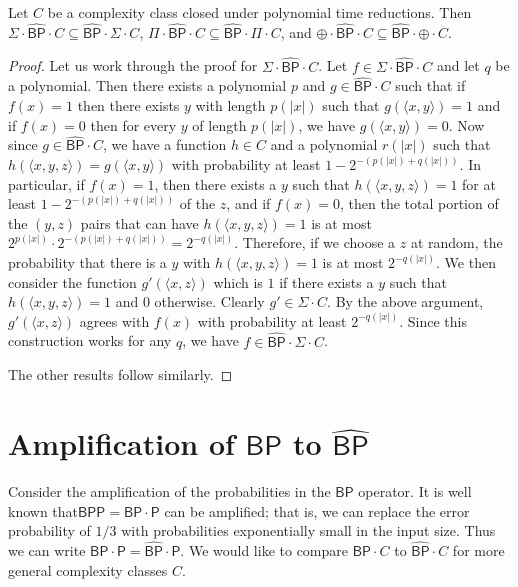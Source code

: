 \documentclass[11pt]{article}
\newcommand{\bp}{\textsf{BP}}
\newcommand{\strongbp}{\widehat{\textsf{BP}}}
\newcommand{\bpp}{\textsf{BPP}}
\newcommand{\parity}{\oplus}
\newcommand{\p}{\textsf{P}}
\begin{document}
\begin{lemma}\label{interchange}
Let $C$ be a complexity class closed under polynomial time reductions. Then $\Sigma\cdot\strongbp\cdot C \subseteq \strongbp\cdot\Sigma\cdot C$, $\Pi\cdot\strongbp\cdot C \subseteq \strongbp\cdot\Pi\cdot C$, and $\parity\cdot\strongbp\cdot C \subseteq \strongbp\cdot\parity\cdot C$.
\end{lemma}
\begin{proof}
Let us work through the proof for $\Sigma\cdot\strongbp\cdot C$. Let $f \in \Sigma\cdot\strongbp\cdot C$ and let $q$ be a polynomial. Then there exists a polynomial $p$ and $g \in \strongbp\cdot C$ such that if $f(x) = 1$ then there exists $y$ with length $p(|x|)$ such that $g(\langle x, y\rangle) = 1$ and if $f(x) = 0$ then for every $y$ of length $p(|x|)$, we have $g(\langle x, y\rangle) = 0$. Now since $g \in \strongbp\cdot C$, we have a function $h \in C$ and a polynomial $r(|x|)$ such that $h(\langle x,y,z\rangle) = g(\langle x,y\rangle)$ with probability at least $1 - 2^{-(p(|x|)+q(|x|))}$. In particular, if $f(x) = 1$, then there exists a $y$ such that $h(\langle x,y,z\rangle) = 1$ for at least $1-2^{-(p(|x|)+q(|x|))}$ of the $z$, and if $f(x) = 0$, then the total portion of the $(y,z)$ pairs that can have $h(\langle x,y,z\rangle) = 1$ is at most $2^{p(|x|)}\cdot2^{-(p(|x|)+q(|x|))} = 2^{-q(|x|)}$. Therefore, if we choose a $z$ at random, the probability that there is a $y$ with $h(\langle x, y, z\rangle) = 1$ is at most $2^{-q(|x|)}$. We then consider the function $g'(\langle x,z\rangle)$ which is $1$ if there exists a $y$ such that $h(\langle x,y,z\rangle) = 1$ and $0$ otherwise. Clearly $g' \in \Sigma \cdot C$. By the above argument, $g'(\langle x,z\rangle)$ agrees with $f(x)$ with probability at least $2^{-q(|x|)}$. Since this construction works for any $q$, we have $f \in \strongbp \cdot \Sigma \cdot C$.

The other results follow similarly.
\end{proof}

\section{Amplification of $\bp$ to $\strongbp$\label{amplifysection}}

Consider the amplification of the probabilities in the $\bp$ operator. It is well known that\linebreak $\bpp = \bp \cdot \p$ can be amplified; that is, we can replace the error probability of $1/3$ with probabilities exponentially small in the input size. Thus we can write $\bp \cdot \p = \strongbp \cdot \p$. We would like to compare $\bp \cdot C$ to $\strongbp \cdot C$ for more general complexity classes $C$.
\end{document}
